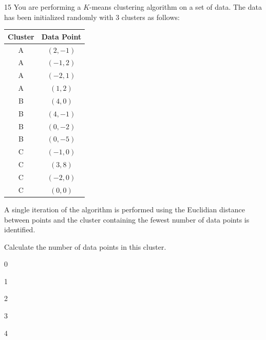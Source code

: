 \begin{question}{15}
You are performing a $K$-means clustering algorithm on a set of data. The data has been initialized randomly with 3 clusters as follows:
\begin{center}
\begin{tabular}{|c|c|}
\hline
Cluster & Data Point \\ \hline
A & $(2, -1)$ \\ \hline
A & $(-1, 2)$ \\ \hline
A & $(-2, 1)$ \\ \hline
A & $(1, 2)$ \\ \hline
B & $(4, 0)$ \\ \hline
B & $(4, -1)$ \\ \hline
B & $(0, -2)$ \\ \hline
B & $(0, -5)$ \\ \hline
C & $(-1, 0)$ \\ \hline
C & $(3, 8)$ \\ \hline
C & $(-2, 0)$ \\ \hline
C & $(0, 0)$ \\ \hline
\end{tabular}
\end{center}

A single iteration of the algorithm is performed using the Euclidian distance between points and the cluster containing the fewest number of data points is identified.

Calculate the number of data points in this cluster.

\begin{choices}
\item 0
\item 1
\item 2
\item 3
\item 4
\end{choices}
\end{question}

